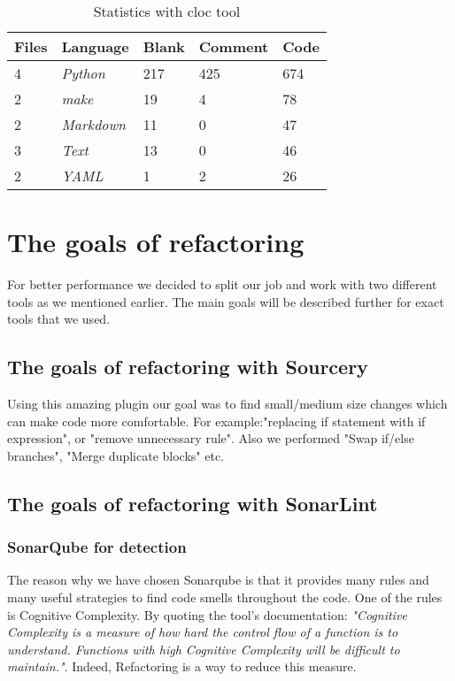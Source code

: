 \documentclass[unicode,11pt,a4paper,oneside,numbers=endperiod,openany]{scrartcl}
\begin{document}
\begin{table}[H]
\begin{tabular}{@{}|l|l|l|l|l|@{}}
\toprule
\textbf{Files} & \textbf{Language} & \textbf{Blank} & \textbf{Comment} & \textbf{Code} \\ \midrule
4              & \textit{Python}   & 217            & 425              & 674           \\ \midrule
2              & \textit{make}     & 19             & 4                & 78            \\ \midrule
2              & \textit{Markdown} & 11             & 0                & 47            \\ \midrule
3              & \textit{Text}     & 13             & 0                & 46            \\ \midrule
2              & \textit{YAML}     & 1              & 2                & 26            \\ \bottomrule
\end{tabular}
\centering

\caption{Statistics with cloc tool}
\label{tab:statscloc}
\end{table}


\section{The goals of refactoring}
For better performance we decided to split our job and work with two different tools as we mentioned earlier. The main goals will be described further for exact tools that we used.
\subsection{The goals of refactoring with Sourcery}
Using this amazing plugin our goal was to find small/medium size changes which can make code more comfortable. For example:"replacing if statement with if expression", or "remove unnecessary rule". Also we performed "Swap if/else branches", "Merge duplicate blocks" etc.
\subsection{The goals of refactoring with SonarLint}
\subsubsection{SonarQube for detection}
The reason why we have chosen Sonarqube is that it provides many rules and many useful strategies to find code smells throughout the code. One of the rules is Cognitive Complexity. By quoting the tool's documentation: \textit{"Cognitive Complexity is a measure of how hard the control flow of a function is to understand. Functions with high Cognitive Complexity will be difficult to maintain."}. Indeed, Refactoring is a way to reduce this measure.
\end{document}
